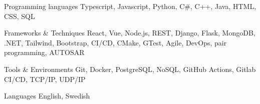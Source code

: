 
\begin{cvskills}

  \cvskill
    {Programming languages} %
    {Typescript, Javascript, Python, C\#, C++, Java, HTML, CSS, SQL} %

  \cvskill
    {Frameworks \& Techniques} %
    {React, Vue, Node.js, REST, Django, Flask, MongoDB, .NET, Tailwind, Bootstrap, CI/CD, CMake, GTest, Agile, DevOps, pair programming, AUTOSAR } %

  \cvskill
    {Tools \& Environments} %
    {Git, Docker, PostgreSQL, NoSQL, GitHub Actions, Gitlab CI/CD, TCP/IP, UDP/IP } %

  \cvskill
    {Languages} %
    {English, Swedish} %

\end{cvskills}
